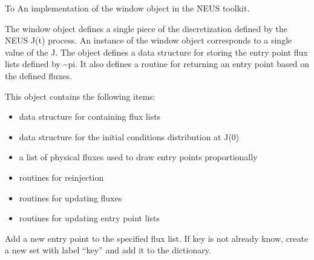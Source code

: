 \documentclass[letterpaper,10pt,english]{sphinxmanual}
\begin{document}
To
\label{applications/applications.doc:module-window}
An implementation of the window object in the NEUS toolkit.

\begin{fulllineitems}
\label{applications/applications.doc:window.window}
The window object defines a single piece of the discretization defined by the NEUS J(t) process. An instance of the window object corresponds to a single value of the J. The object defines a data structure for storing the entry point flux lists defined by \textasciitilde{}pi. It also defines a routine for returning an entry point based on the defined fluxes.

This object contains the following items:
\begin{itemize}
\item {} 
data structure for containing flux lists

\item {} 
data structure for the initial conditions distribution at J(0)

\item {} 
a list of physical fluxes used to draw entry points proportionally

\item {} 
routines for reinjection

\item {} 
routines for updating fluxes

\item {} 
routines for updating entry point lists

\end{itemize}

\begin{fulllineitems}
\label{applications/applications.doc:window.window.add_entry_point}
Add a new entry point to the specified flux list. If key is not already know, create a new set with label ``key'' and add it to the dictionary.

\end{fulllineitems}


\end{fulllineitems}
\end{document}
